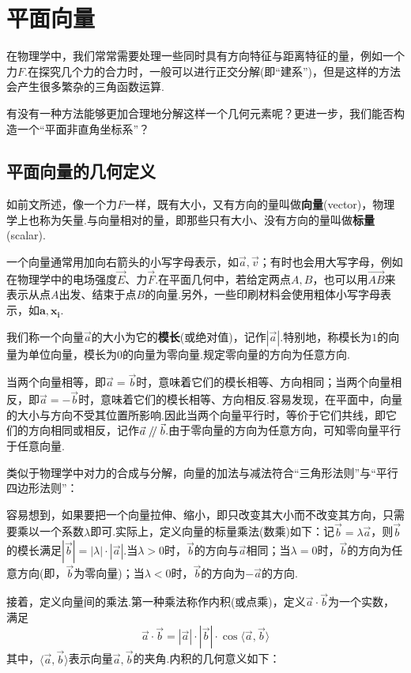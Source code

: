 \documentclass[lang=cn, zihao=5]{elegantbook}
\newcommand{\xl}[1]{\overrightarrow{#1}}
\newcommand{\pll}{\kern 0.56em/\kern -0.8em /\kern 0.56em}
\begin{document}
\chapter{平面向量}

在物理学中，我们常常需要处理一些同时具有方向特征与距离特征的量，例如一个力$F$.在探究几个力的合力时，一般可以进行正交分解(即“建系”)，但是这样的方法会产生很多繁杂的三角函数运算.

有没有一种方法能够更加合理地分解这样一个几何元素呢？更进一步，我们能否构造一个“平面非直角坐标系”？

\section{平面向量的几何定义}

如前文所述，像一个力$F$一样，既有大小，又有方向的量叫做\textbf{向量}(vector)，物理学上也称为矢量.与向量相对的量，即那些只有大小、没有方向的量叫做\textbf{标量}(scalar).

一个向量通常用加向右箭头的小写字母表示，如$\vec{a},\vec{v}$；有时也会用大写字母，例如在物理学中的电场强度$\vec{E}$、力$\vec{F}$.在平面几何中，若给定两点$A,B$，也可以用$\xl{AB}$来表示从点$A$出发、结束于点$B$的向量.另外，一些印刷材料会使用粗体小写字母表示，如$\boldsymbol{a},\boldsymbol{x_i}$.

我们称一个向量$\vec{a}$的大小为它的\textbf{模长}(或绝对值)，记作$|\vec{a}|$.特别地，称模长为$1$的向量为单位向量，模长为$0$的向量为零向量.规定零向量的方向为任意方向.

当两个向量相等，即$\vec{a}=\vec{b}$时，意味着它们的模长相等、方向相同；当两个向量相反，即$\vec{a}=-\vec{b}$时，意味着它们的模长相等、方向相反.容易发现，在平面中，向量的大小与方向不受其位置所影响.因此当两个向量平行时，等价于它们共线，即它们的方向相同或相反，记作$\vec{a} \pll \vec{b}$.由于零向量的方向为任意方向，可知零向量平行于任意向量.

类似于物理学中对力的合成与分解，向量的加法与减法符合“三角形法则”与“平行四边形法则”：


容易想到，如果要把一个向量拉伸、缩小，即只改变其大小而不改变其方向，只需要乘以一个系数$\lambda$即可.实际上，定义向量的标量乘法(数乘)如下：记$\vec{b}=\lambda \vec{a}$，则$\vec{b}$的模长满足$|\vec{b}|=|\lambda | \cdot |\vec{a}|$.当$\lambda > 0$时，$\vec{b}$的方向与$\vec{a}$相同；当$\lambda = 0$时，$\vec{b}$的方向为任意方向(即，$\vec{b}$为零向量)；当$\lambda < 0$时，$\vec{b}$的方向为$-\vec{a}$的方向.

接着，定义向量间的乘法.第一种乘法称作内积(或点乘)，定义$\vec{a} \cdot \vec{b}$为一个实数，满足$$\vec{a} \cdot \vec{b} = |\vec{a}| \cdot |\vec{b}| \cdot \cos \langle \vec{a},\vec{b} \rangle$$
其中，$\langle \vec{a},\vec{b} \rangle$表示向量$\vec{a},\vec{b}$的夹角.内积的几何意义如下：
\end{document}
